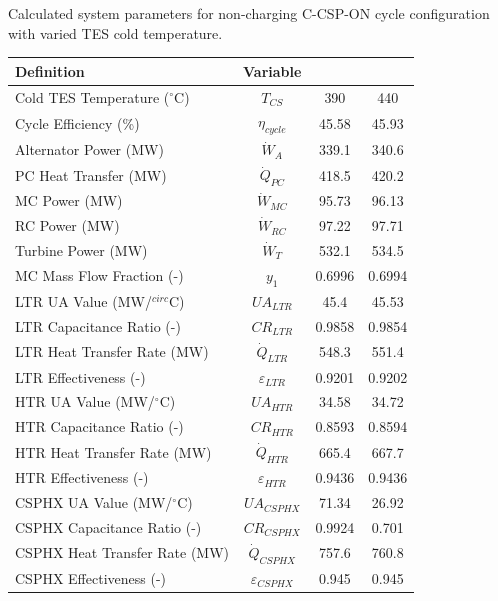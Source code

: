 \begin{paracol}{2}
\begin{specialtable}[H] 
    \caption{Calculated system parameters for non-charging C-CSP-ON cycle configuration with varied TES cold temperature. \label{tab-c-csp-on}}
    \begin{tabular}{lccc}
    \toprule
    \textbf{Definition} & \textbf{Variable} &  &\\
    \midrule
    Cold TES Temperature ($^{\circ}$C)	&	$T_{CS}$	&	390	&	440	\\
    Cycle Efficiency (\%)	&	$\eta_{cycle}$	&	45.58	&	45.93	\\
    Alternator Power (MW)	&	$\dot{W}_{A}$	&	339.1	&	340.6	\\
    PC Heat Transfer (MW)	&	$\dot{Q}_{PC}$	&	418.5	&	420.2	\\
    MC Power (MW)	&	$\dot{W}_{MC}$	&	95.73	&	96.13	\\
    RC Power (MW)	&	$\dot{W}_{RC}$	&	97.22	&	97.71	\\
    Turbine Power (MW)	&	$\dot{W}_{T}$	&	532.1	&	534.5	\\
    MC Mass Flow Fraction (-)	&	$y_{1}$	&	0.6996	&	0.6994	\\
    LTR UA Value (MW/$^{circ}$C)	&	$UA_{LTR}$	&	45.4	&	45.53	\\
    LTR Capacitance Ratio (-)	&	$CR_{LTR}$	&	0.9858	&	0.9854	\\
    LTR Heat Transfer Rate (MW)	&	$\dot{Q}_{LTR}$	&	548.3	&	551.4	\\
    LTR Effectiveness (-)	&	$\varepsilon_{LTR}$	&	0.9201	&	0.9202	\\
    HTR UA Value (MW/$^{\circ}$C)	&	$UA_{HTR}$	&	34.58	&	34.72	\\
    HTR Capacitance Ratio (-)	&	$CR_{HTR}$	&	0.8593	&	0.8594	\\
    HTR Heat Transfer Rate (MW)	&	$\dot{Q}_{HTR}$	&	665.4	&	667.7	\\
    HTR Effectiveness (-)	&	$\varepsilon_{HTR}$	&	0.9436	&	0.9436	\\
    CSPHX UA Value (MW/$^{\circ}$C)	&	$UA_{CSPHX}$	&	71.34	&	26.92	\\
    CSPHX Capacitance Ratio (-)	&	$CR_{CSPHX}$	&	0.9924	&	0.701	\\
    CSPHX Heat Transfer Rate (MW)	&	$\dot{Q}_{CSPHX}$	&	757.6	&	760.8	\\
    CSPHX Effectiveness (-)	&	$\varepsilon_{CSPHX}$	&	0.945	&	0.945	\\
    \bottomrule
    \end{tabular}\\
\end{specialtable}


\end{paracol}
